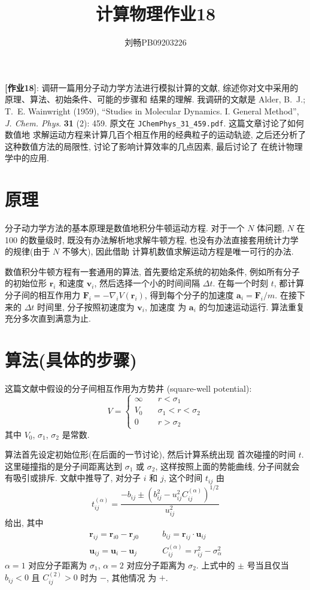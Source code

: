 \documentclass{ctexart}
\def\vec#1{\mathbf{#1}}
\begin{document}
\title{计算物理作业18}
\author{刘畅\quad PB09203226}
\maketitle
{\bf[作业18]}: 调研一篇用分子动力学方法进行模拟计算的文献, 
综述你对文中采用的原理、算法、初始条件、可能的步骤和
结果的理解. 
\bigbreak
我调研的文献是 Alder, B.~J.; T.~E. Wainwright (1959), ``Studies in Molecular Dynamics. I. General Method'', {\sl J. Chem. Phys}. {\bf 31} (2): 459. 原文在
\verb|JChemPhys_31_459.pdf|. 这篇文章讨论了如何数值地
求解运动方程来计算几百个相互作用的经典粒子的运动轨迹, 之后还分析了
这种数值方法的局限性, 讨论了影响计算效率的几点因素, 最后讨论了
在统计物理学中的应用. 

\section{原理}
分子动力学方法的基本原理是数值地积分牛顿运动方程. 对于一个 $N$
体问题, $N$ 在 100 的数量级时, 既没有办法解析地求解牛顿方程, 
也没有办法直接套用统计力学的规律(由于 $N$ 不够大), 因此借助
计算机数值求解运动方程是唯一可行的办法. 

数值积分牛顿方程有一套通用的算法, 首先要给定系统的初始条件, 
例如所有分子的初始位形 $\vec r_i$ 和速度 $\vec v_i$, 然后选择一个小的时间间隔 $\Delta t$. 在每一个时刻 $t$, 都计算
分子间的相互作用力 $\vec F_i = -\nabla_i V(\vec r_i)$,
得到每个分子的加速度 $\vec a_i = \vec F_i/m$. 在接下来的
$\Delta t$ 时间里, 分子按照初速度为 $\vec v_i$, 加速度
为 $\vec a_i$ 的匀加速运动运行. 算法重复充分多次直到满意为止. 

\section{算法(具体的步骤)}
这篇文献中假设的分子间相互作用为方势井 (square-well potential):
\begin{equation}\label{potential}
V = \begin{cases}
\infty&\quad r<\sigma_1\\
V_0&\quad \sigma_1<r<\sigma_2\\
0&\quad r>\sigma_2
\end{cases}
\end{equation}
其中 $V_0$, $\sigma_1$, $\sigma_2$ 是常数.

算法首先设定初始位形(在后面的一节讨论), 然后计算系统出现
首次碰撞的时间 $t$. 这里碰撞指的是分子间距离达到 $\sigma_1$
或 $\sigma_2$, 这样按照上面的势能曲线, 分子间就会有吸引或排斥. 文献中推导了, 对分子 $i$ 和 $j$, 这个时间 $t_{ij}$ 由
\[
t^{(\alpha)}_{ij} = \frac{-b_{ij}\pm\left(b_{ij}^2
-u_{ij}^2C^{(\alpha)}_{ij}\right)^{1/2}}{u^2_{ij}}
\]
给出, 其中
\begin{align}\label{cond}
\vec r_{ij} = \vec r_{i0}-\vec r_{j0}\qquad&
b_{ij} = \vec r_{ij} \cdot \vec u_{ij}\\
\vec u_{ij} = \vec u_i - \vec u_j\qquad&
C^{(\alpha)}_{ij} = r^2_{ij} - \sigma_\alpha^2
\end{align}
$\alpha=1$ 对应分子距离为 $\sigma_1$, $\alpha=2$
对应分子距离为 $\sigma_2$. 上式中的 $\pm$ 号当且仅当
$b_{ij}<0$ 且 $C^{(2)}_{ij} >0$ 时为 $-$, 其他情况
为 $+$.
\end{document}
